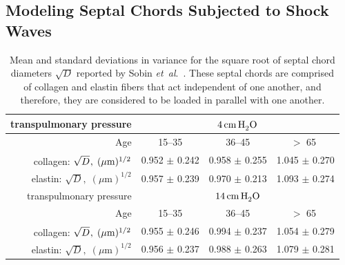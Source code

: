 \subsection{Modeling Septal Chords Subjected to Shock Waves}

\begin{table}
    \centering
    \begin{tabular}{|r|ccc|} 
        \hline 
        transpulmonary pressure &
        \multicolumn{3}{|c|}{$4 \, \mathrm{cm} \, \mathrm{H}_2^{\vphantom{|}} \mathrm{O}$} \\ 
        \hline
        Age & 15--35 & 36--45 & $>$ 65 $\vphantom{|}^{\vphantom{|}}$ \\ \hline 
        collagen: $\sqrt{D}^{\vphantom{|}}, \; ( \mu \textrm{m} )^{1/2}$ & 
        0.952 $\pm$ 0.242 & 0.958 $\pm$ 0.255 & 1.045 $\pm$ 0.270 \\
        elastin: $\sqrt{D}, \; ( \mu \textrm{m} )^{1/2}$ & 
        0.957 $\pm$ 0.239 & 0.970 $\pm$ 0.213 & 1.093 $\pm$ 0.274 \\
        \hline\hline       
        transpulmonary pressure &
        \multicolumn{3}{|c|}{$14 \, \mathrm{cm} \, \mathrm{H}_2^{\vphantom{|}} \mathrm{O}$} \\ 
        \hline
        Age & 15--35 & 36--45 & $>$ 65 $\vphantom{|}^{\vphantom{|}}$ \\ \hline 
        collagen: $\sqrt{D}^{\vphantom{|}}, \; ( \mu \textrm{m} )^{1/2}$ & 
        0.955 $\pm$ 0.246 & 0.994 $\pm$ 0.237 & 1.054 $\pm$ 0.279 \\
        elastin: $\sqrt{D}, \; ( \mu \textrm{m} )^{1/2}$ & 
        0.956 $\pm$ 0.237 & 0.988 $\pm$ 0.263 & 1.079 $\pm$ 0.281 \\
        \hline
    \end{tabular}
    \caption{\label{tab:alveolarProp}
        Mean and standard deviations in variance for the square root of septal chord diameters $\sqrt{D}$ reported by Sobin \textit{et~al}.\ \cite{Sobinetal88}.  These septal chords are comprised of collagen and elastin fibers that act independent of one another, and therefore, they are considered to be loaded in parallel with one another.}
\end{table}

